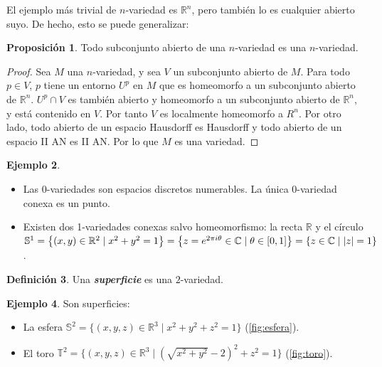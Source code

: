 \documentclass[10pt]{report}
\newcommand{\C}{\mathbb{C}}
\newcommand{\R}{\mathbb{R}}
\theoremstyle{definition}
\newtheorem{defin}{Definición}[section]
\newtheorem{prop}[defin]{Proposición}
\newtheorem{eje}[defin]{Ejemplo}
\begin{document}
El ejemplo más trivial de $n$-variedad es $\R^n$, pero también lo es cualquier abierto suyo. De hecho, esto se puede generalizar:
\begin{prop}%
Todo subconjunto abierto de una $n$-variedad es una $n$-variedad.
\end{prop}
\begin{proof}
Sea $M$ una $n$-variedad, y sea $V$ un subconjunto abierto de $M$. Para todo $p\in V$, $p$ tiene un entorno $U^p$ en $M$ que es homeomorfo a un subconjunto abierto de $\R^n$. $U^p\cap V$ es también abierto y homeomorfo a un subconjunto abierto de $\R^n$, y está contenido en $V$. Por tanto $V$ es localmente homeomorfo a $R^n$. Por otro lado, todo abierto de un espacio Hausdorff es Hausdorff y todo abierto de un espacio II AN es II AN. Por lo que $M$ es una variedad.
\end{proof}
\begin{eje}%
\begin{itemize}
\item Las 0-variedades son espacios discretos numerables. La única 0-variedad conexa es un punto.
\item Existen dos 1-variedades conexas salvo homeomorfismo: la recta $\R$ y el círculo $\mathbb{S}^1\\
=\left\{(x,y)\in \R^2\mid x^2+y^2=1\right\}=\left\{z=e^{2\pi i\theta}\in \C \mid \theta \in \left[0,1\right] \right\}=\left\{ z\in \C \mid |z|=1\right\}$.
\end{itemize}
\end{eje}
\begin{defin}%
Una \textbf{\emph{superficie}} es una $2$-variedad.
\end{defin}
\begin{eje}%
Son superficies:
\begin{itemize}
\item La esfera $\mathbb{S}^2=\{(x,y,z) \in \R^3\mid  x^2+y^2+z^2=1\}$ (\autoref{fig:esfera}).
\item El toro $\mathbb{T}^2=\{(x,y,z)\in \R^3\mid  (\sqrt{x^2+y^2}-2)^2+z^2=1\}$ (\autoref{fig:toro}).
\end{itemize}
\end{eje}
\end{document}
